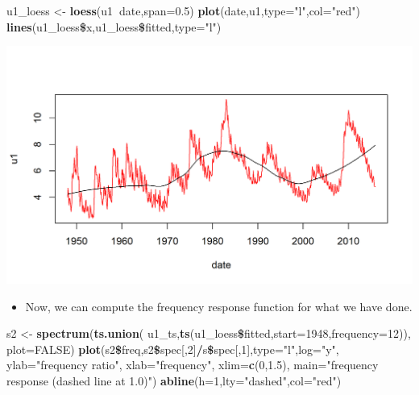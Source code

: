 \documentclass[]{article}
\newenvironment{Shaded}{\begin{snugshade}}{\end{snugshade}}
\newcommand{\KeywordTok}[1]{\textcolor[rgb]{0.13,0.29,0.53}{\textbf{#1}}}
\newcommand{\DataTypeTok}[1]{\textcolor[rgb]{0.13,0.29,0.53}{#1}}
\newcommand{\DecValTok}[1]{\textcolor[rgb]{0.00,0.00,0.81}{#1}}
\newcommand{\FloatTok}[1]{\textcolor[rgb]{0.00,0.00,0.81}{#1}}
\newcommand{\StringTok}[1]{\textcolor[rgb]{0.31,0.60,0.02}{#1}}
\newcommand{\OtherTok}[1]{\textcolor[rgb]{0.56,0.35,0.01}{#1}}
\newcommand{\OperatorTok}[1]{\textcolor[rgb]{0.81,0.36,0.00}{\textbf{#1}}}
\newcommand{\NormalTok}[1]{#1}
\providecommand{\tightlist}{%
  \setlength{\itemsep}{0pt}\setlength{\parskip}{0pt}}
\begin{document}
\begin{Shaded}
\begin{Highlighting}[]
\NormalTok{u1_loess <-}\StringTok{ }\KeywordTok{loess}\NormalTok{(u1}\OperatorTok{~}\NormalTok{date,}\DataTypeTok{span=}\FloatTok{0.5}\NormalTok{)}
\KeywordTok{plot}\NormalTok{(date,u1,}\DataTypeTok{type=}\StringTok{"l"}\NormalTok{,}\DataTypeTok{col=}\StringTok{"red"}\NormalTok{)}
\KeywordTok{lines}\NormalTok{(u1_loess}\OperatorTok{\$}\NormalTok{x,u1_loess}\OperatorTok{\$}\NormalTok{fitted,}\DataTypeTok{type=}\StringTok{"l"}\NormalTok{)}
\end{Highlighting}
\end{Shaded}

\begin{center}\includegraphics{figure/intro-loess-1} \end{center}

\begin{itemize}
\tightlist
\item
  Now, we can compute the frequency response function for what we have
  done.
\end{itemize}

\begin{Shaded}
\begin{Highlighting}[]
\NormalTok{s2 <-}\StringTok{ }\KeywordTok{spectrum}\NormalTok{(}\KeywordTok{ts.union}\NormalTok{(}
\NormalTok{  u1_ts,}\KeywordTok{ts}\NormalTok{(u1_loess}\OperatorTok{\$}\NormalTok{fitted,}\DataTypeTok{start=}\DecValTok{1948}\NormalTok{,}\DataTypeTok{frequency=}\DecValTok{12}\NormalTok{)),}
  \DataTypeTok{plot=}\OtherTok{FALSE}\NormalTok{)}
\KeywordTok{plot}\NormalTok{(s2}\OperatorTok{\$}\NormalTok{freq,s2}\OperatorTok{\$}\NormalTok{spec[,}\DecValTok{2}\NormalTok{]}\OperatorTok{/}\NormalTok{s}\OperatorTok{\$}\NormalTok{spec[,}\DecValTok{1}\NormalTok{],}\DataTypeTok{type=}\StringTok{"l"}\NormalTok{,}\DataTypeTok{log=}\StringTok{"y"}\NormalTok{,}
  \DataTypeTok{ylab=}\StringTok{"frequency ratio"}\NormalTok{, }\DataTypeTok{xlab=}\StringTok{"frequency"}\NormalTok{, }\DataTypeTok{xlim=}\KeywordTok{c}\NormalTok{(}\DecValTok{0}\NormalTok{,}\FloatTok{1.5}\NormalTok{),}
  \DataTypeTok{main=}\StringTok{"frequency response (dashed line at 1.0)"}\NormalTok{)}
\KeywordTok{abline}\NormalTok{(}\DataTypeTok{h=}\DecValTok{1}\NormalTok{,}\DataTypeTok{lty=}\StringTok{"dashed"}\NormalTok{,}\DataTypeTok{col=}\StringTok{"red"}\NormalTok{)}
\end{Highlighting}
\end{Shaded}
\end{document}

